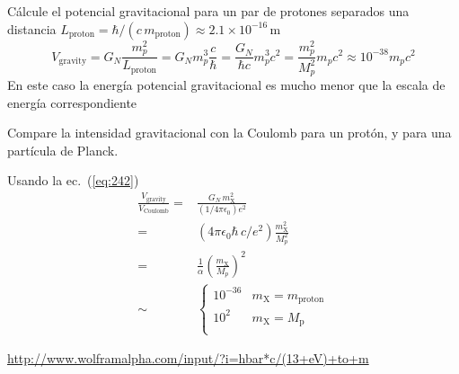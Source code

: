 \begin{example}
  Cálcule el potencial gravitacional para un par de protones separados una distancia  $L_{\text{proton}}=\hbar/(c\, m_{\text{proton}})\approx2.1\times10^{-16}\,\text{m}$
\begin{equation}
    V_{\text{gravity}}=G_N\frac{m_p^2}{L_{\text{proton}}}=G_N m_p^3\frac{c}{\hbar}=\frac{G_N}{\hbar c}m_p^3c^2=\frac{m_p^2}{M_p^2}m_pc^2\approx10^{-38}m_pc^2
\end{equation}
En este caso la energía potencial gravitacional es mucho menor que la escala de energía correspondiente
\end{example}
\begin{example}
Compare la intensidad gravitacional con la Coulomb para un protón, y para una partícula de Planck.

Usando la ec.~(\ref{eq:242})
\begin{align}
\frac{V_{\text{gravity}}}{V_{\text{Coulomb}}}=&\frac{G_N\,m_{\text{X}}^2}{(1/4\pi\epsilon_0)e^2}\nonumber\\
=&(4\pi\epsilon_0\hbar\,c/e^2)\frac{m_{\text{X}}^2}{M_p^2}\nonumber\\
=&\frac{1}{\alpha}\left(\frac{m_{\text{X}}}{M_p}\right)^2\nonumber\\
\sim&
\begin{cases}
  10^{-36}&m_{\text{X}}=m_{\text{proton}}\\
  10^{2}&m_{\text{X}}=M_{\text{p}}\\
\end{cases}
\end{align}
\end{example}

\url{http://www.wolframalpha.com/input/?i=hbar*c/(13+eV)+to+m}


